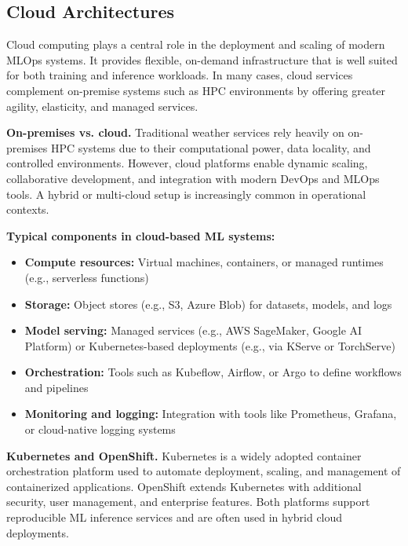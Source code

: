 %
\subsection{Cloud Architectures}

Cloud computing plays a central role in the deployment and scaling of modern MLOps systems. It provides flexible, on-demand infrastructure that is well suited for both training and inference workloads. In many cases, cloud services complement on-premise systems such as HPC environments by offering greater agility, elasticity, and managed services.

{\bf On-premises vs. cloud.} Traditional weather services rely heavily on on-premises HPC systems due to their computational power, data locality, and controlled environments. However, cloud platforms enable dynamic scaling, collaborative development, and integration with modern DevOps and MLOps tools. A hybrid or multi-cloud setup is increasingly common in operational contexts.

{\bf Typical components in cloud-based ML systems:}
\begin{itemize}
	\item \textbf{Compute resources:} Virtual machines, containers, or managed runtimes (e.g., serverless functions)
	\item \textbf{Storage:} Object stores (e.g., S3, Azure Blob) for datasets, models, and logs
	\item \textbf{Model serving:} Managed services (e.g., AWS SageMaker, Google AI Platform) or Kubernetes-based deployments (e.g., via KServe or TorchServe)
	\item \textbf{Orchestration:} Tools such as Kubeflow, Airflow, or Argo to define workflows and pipelines
	\item \textbf{Monitoring and logging:} Integration with tools like Prometheus, Grafana, or cloud-native logging systems
\end{itemize}

{\bf Kubernetes and OpenShift.} Kubernetes is a widely adopted container orchestration platform used to automate deployment, scaling, and management of containerized applications. OpenShift extends Kubernetes with additional security, user management, and enterprise features. Both platforms support reproducible ML inference services and are often used in hybrid cloud deployments.

